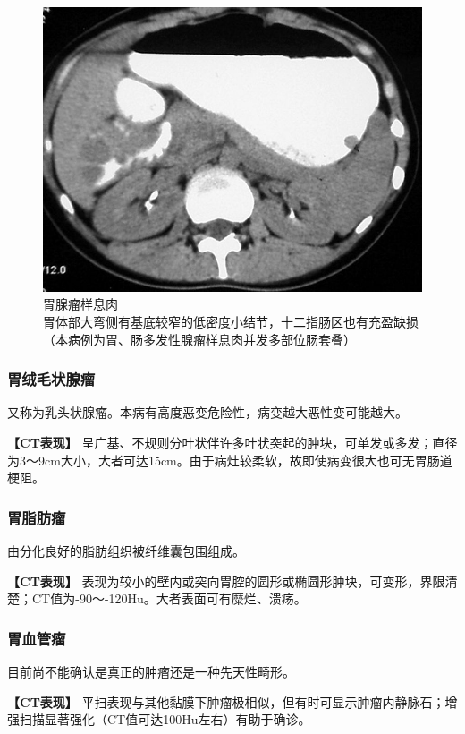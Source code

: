 \begin{figure}[!htbp]
 \centering
 \includegraphics[width=.7\textwidth,height=\textheight,keepaspectratio]{./images/Image00359.jpg}
 \captionsetup{justification=centering}
 \caption{胃腺瘤样息肉\\{\small 胃体部大弯侧有基底较窄的低密度小结节，十二指肠区也有充盈缺损（本病例为胃、肠多发性腺瘤样息肉并发多部位肠套叠）}}
 \label{fig17-8}
  \end{figure} 

\subsubsection{胃绒毛状腺瘤}

又称为乳头状腺瘤。本病有高度恶变危险性，病变越大恶性变可能越大。

\textbf{【CT表现】}
呈广基、不规则分叶状伴许多叶状突起的肿块，可单发或多发；直径为3～9cm大小，大者可达15cm。由于病灶较柔软，故即使病变很大也可无胃肠道梗阻。

\subsubsection{胃脂肪瘤}

由分化良好的脂肪组织被纤维囊包围组成。

\textbf{【CT表现】}
表现为较小的壁内或突向胃腔的圆形或椭圆形肿块，可变形，界限清楚；CT值为-90～-120Hu。大者表面可有糜烂、溃疡。

\subsubsection{胃血管瘤}

目前尚不能确认是真正的肿瘤还是一种先天性畸形。

\textbf{【CT表现】}
平扫表现与其他黏膜下肿瘤极相似，但有时可显示肿瘤内静脉石；增强扫描显著强化（CT值可达100Hu左右）有助于确诊。

